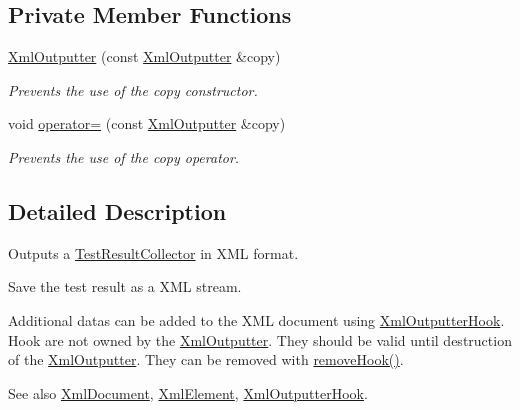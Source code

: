 \subsection*{Private Member Functions}
\begin{DoxyCompactItemize}
\item 
\hyperlink{class_xml_outputter_a5bf3760d02d06decd57733fd1169b635}{Xml\+Outputter} (const \hyperlink{class_xml_outputter}{Xml\+Outputter} \&copy)\hypertarget{class_xml_outputter_a5bf3760d02d06decd57733fd1169b635}{}\label{class_xml_outputter_a5bf3760d02d06decd57733fd1169b635}

\begin{DoxyCompactList}\small\item\em Prevents the use of the copy constructor. \end{DoxyCompactList}\item 
void \hyperlink{class_xml_outputter_adecf684d1a00c953cc805539d3bba040}{operator=} (const \hyperlink{class_xml_outputter}{Xml\+Outputter} \&copy)\hypertarget{class_xml_outputter_adecf684d1a00c953cc805539d3bba040}{}\label{class_xml_outputter_adecf684d1a00c953cc805539d3bba040}

\begin{DoxyCompactList}\small\item\em Prevents the use of the copy operator. \end{DoxyCompactList}\end{DoxyCompactItemize}


\subsection{Detailed Description}
Outputs a \hyperlink{class_test_result_collector}{Test\+Result\+Collector} in X\+ML format.

Save the test result as a X\+ML stream. 

Additional datas can be added to the X\+ML document using \hyperlink{class_xml_outputter_hook}{Xml\+Outputter\+Hook}. Hook are not owned by the \hyperlink{class_xml_outputter}{Xml\+Outputter}. They should be valid until destruction of the \hyperlink{class_xml_outputter}{Xml\+Outputter}. They can be removed with \hyperlink{class_xml_outputter_ac4659712ab6b0f168119a22fbdb70255}{remove\+Hook()}.

\begin{DoxySeeAlso}{See also}
\hyperlink{class_xml_document}{Xml\+Document}, \hyperlink{class_xml_element}{Xml\+Element}, \hyperlink{class_xml_outputter_hook}{Xml\+Outputter\+Hook}. 
\end{DoxySeeAlso}



